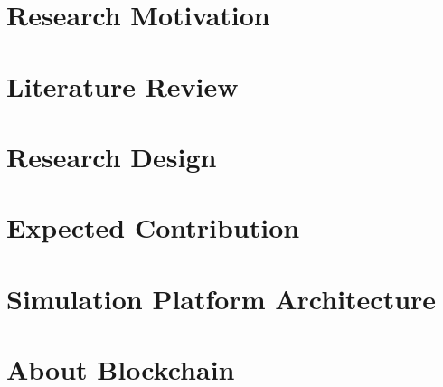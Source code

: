 \documentclass[a4paper]{article}
\begin{document}
	


\tableofcontents
\clearpage
\listoffigures
\clearpage
\listoftables
\clearpage


\section{Research Motivation}
\label{sec:research_motivation}

\clearpage

\section{Literature Review}
\label{sec:literature_review}

\clearpage

\section{Research Design}
\label{sec:research_design}


\section{Expected Contribution}
\label{sec:expected_contribution}

\clearpage

\section{Simulation Platform Architecture}
\label{sec:Simulation Platform Architecture}

\clearpage

\section{About Blockchain}
\label{sec:about_blockchain}


\clearpage
\printbibliography
\end{document}
